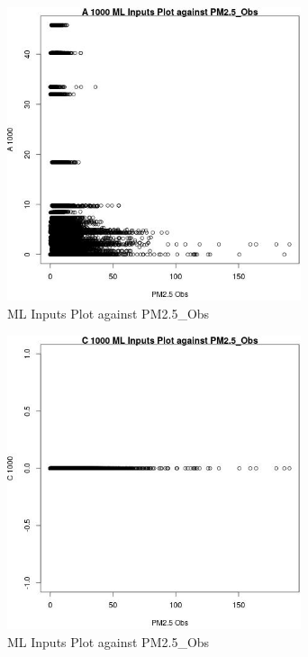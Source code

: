 \begin{figure} 
\centering  
\includegraphics[width=0.77\textwidth]{Code_Outputs/Report_ML_input_PM25_Step4_part_e_de_duplicated_aves_A_1000vPM25_Obs.jpg} 
\caption{\label{fig:Report_ML_input_PM25_Step4_part_e_de_duplicated_avesA_1000vPM25_Obs}ML Inputs Plot against PM2.5_Obs} 
\end{figure} 
 

\begin{figure} 
\centering  
\includegraphics[width=0.77\textwidth]{Code_Outputs/Report_ML_input_PM25_Step4_part_e_de_duplicated_aves_C_1000vPM25_Obs.jpg} 
\caption{\label{fig:Report_ML_input_PM25_Step4_part_e_de_duplicated_avesC_1000vPM25_Obs}ML Inputs Plot against PM2.5_Obs} 
\end{figure} 
 

